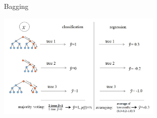 \begin{vbframe}{Bagging}
\begin{center}
\includegraphics[width=0.6\textwidth]{figure_man/rf_majvot_averaging.png}
\end{center}
\end{vbframe}


